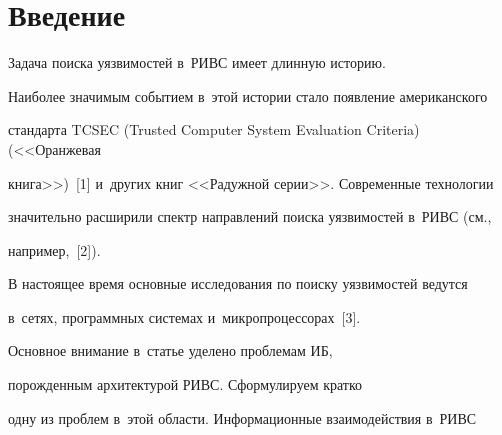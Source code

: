 















      \thispagestyle{headings}


      


                        \vspace*{-16pt}


     


\section{Введение}





\vspace*{-4pt}





  Задача поиска уязвимостей в~РИВС имеет длинную историю. 


Наиболее значимым событием в~этой истории стало появление американского 


стандарта TCSEC (Trusted Computer System Evaluation Criteria) (<<Оранжевая 


книга>>)~[1] и~других книг <<Радужной серии>>. Современные технологии 


значительно расширили спектр направлений поиска уязвимостей в~РИВС (см., 


например,~[2]). 


  


  В настоящее время основные исследования по поиску уязвимостей ведутся 


в~сетях, программных системах и~микропроцессорах~[3].








  


  Основное внимание в~статье уделено проблемам ИБ, 


  порожденным архитектурой РИВС. Сформулируем кратко 


одну из  проблем в~этой области. Информационные взаимодействия в~РИВС 


